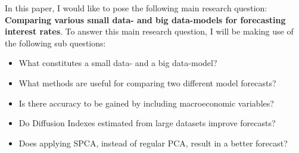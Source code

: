 In this paper, I would like to pose the following main research question:
\textbf{Comparing various small data- and big data-models for forecasting interest rates}. 
To answer this main research question, I will be making use of the following sub questions:
\begin{itemize}
	\item What constitutes a small data- and a big data-model?
	\item What methods are useful for comparing two different model forecasts?
	\item Is there accuracy to be gained by including macroeconomic variables?
	\item Do Diffusion Indexes estimated from large datasets improve forecasts?
	\item Does applying SPCA, instead of regular PCA, result in a better forecast?
\end{itemize}